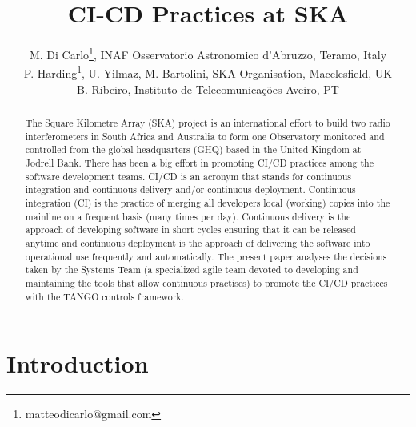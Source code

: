 \documentclass[a4paper,
               keeplastbox,   %
               ]{jacow}
\begin{document}
\title{CI-CD Practices at SKA}

\author{M. Di Carlo\thanks{matteodicarlo@gmail.com}, INAF Osservatorio Astronomico d'Abruzzo, Teramo, Italy \\
        P. Harding\textsuperscript{1}, U. Yilmaz, M. Bartolini, SKA Organisation, Macclesfield, UK \\
        B. Ribeiro, Instituto de Telecomunicações Aveiro, PT}

\maketitle

\begin{abstract}
The Square Kilometre Array (SKA) project is an international effort to build two radio interferometers in South Africa and Australia to form one Observatory monitored and controlled from the global headquarters (GHQ) based in the United Kingdom at Jodrell Bank. There has been a big effort in promoting CI/CD practices among the software development teams. CI/CD is an acronym that stands for continuous integration and continuous delivery and/or continuous deployment. Continuous integration (CI) is the practice of merging all developers local (working) copies into the mainline on a frequent basis (many times per day). Continuous delivery is the approach of developing software in short cycles ensuring that it can be released anytime and continuous deployment is the approach of delivering the software into operational use frequently and automatically. The present paper analyses the decisions taken by the Systems Team (a specialized agile team devoted to developing and maintaining the tools that allow continuous practises) to promote the CI/CD practices with the TANGO controls framework.
\end{abstract}

\section{Introduction}
\label{sec:intro}  %
\end{document}
